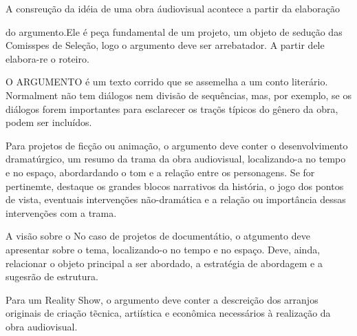 A consreução da idéia de uma obra áudiovisual acontece a partir da elaboração

 do argumento.Ele é peça fundamental de um projeto, um objeto de sedução das Comisspes de Seleção, logo o argumento deve ser arrebatador. A partir dele elabora-re o roteiro.

O ARGUMENTO é um texto corrido que se assemelha a um conto literário. Normalment não tem diálogos nem divisão de sequências, mas, por exemplo, se os diálogos forem importantes para esclarecer os traçõs típicos do gênero da obra, podem ser incluídos.

Para projetos de ficção ou animação, o argumento deve conter o desenvolvimento dramatúrgico, um resumo da trama da obra audiovisual, localizando-a no tempo e no espaço, abordardando o tom e a relação entre os personagens. Se for pertinemte, destaque os grandes blocos narrativos da história, o jogo dos pontos de vista, eventuais intervenções não-dramática e a relação ou importância dessas intervenções com a trama.

A visão sobre o No caso de projetos de documentátio, o atgumento deve apresentar sobre o tema, localizando-o no tempo e no espaço. Deve, ainda, relacionar o objeto principal a ser abordado, a estratégia de abordagem e a sugesrão de estrutura.

Para um Reality Show, o argumento deve conter a descreição dos arranjos originais de criação tẽcnica, artiística e econômica necessários à realização da obra audiovisual.








